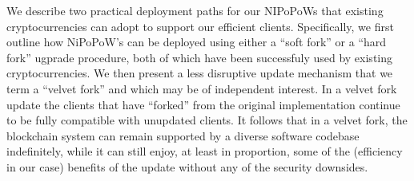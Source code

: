 We describe two practical deployment paths for our NIPoPoWs that existing
cryptocurrencies can  adopt to support our efficient clients. Specifically, we
first outline how NiPoPoW's can be deployed using either a ``soft fork'' or a
``hard fork'' ugprade procedure, both of which have been successfuly used by
existing cryptocurrencies. We then present a less disruptive update mechanism
that we term a ``velvet fork'' and which may be of independent interest. In a
velvet fork update the clients that have ``forked'' from the original
implementation continue to be fully compatible with unupdated clients. It
follows that in a velvet fork, the blockchain system can remain supported by a
diverse software codebase indefinitely, while it can still enjoy, at least in
proportion, some of the (efficiency in our case) benefits of the update without
any of the  security downsides.
